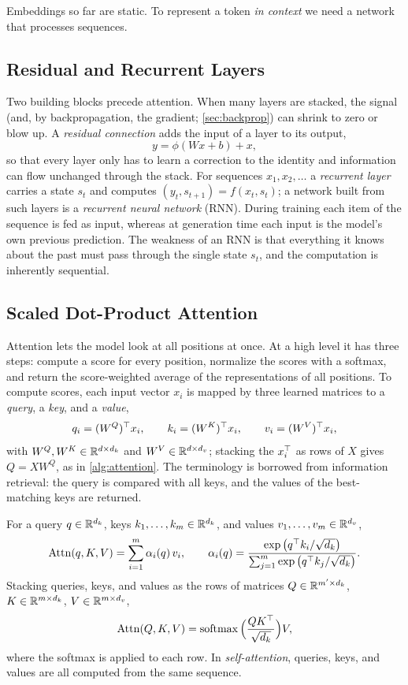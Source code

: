 Embeddings so far are static. To represent a token \emph{in context} we need a network that processes sequences.

\subsection{Residual and Recurrent Layers}

Two building blocks precede attention. When many layers are stacked, the signal (and, by backpropagation, the gradient; \cref{sec:backprop}) can shrink to zero or blow up. A \emph{residual connection} adds the input of a layer to its output,
\[
y=\phi(Wx+b)+x,
\]
so that every layer only has to learn a correction to the identity and information can flow unchanged through the stack. For sequences $x_1,x_2,\dots$ a \emph{recurrent layer} carries a state $s_t$ and computes $(y_t,s_{t+1})=f(x_t,s_t)$; a network built from such layers is a \emph{recurrent neural network} (RNN). During training each item of the sequence is fed as input, whereas at generation time each input is the model's own previous prediction. The weakness of an RNN is that everything it knows about the past must pass through the single state $s_t$, and the computation is inherently sequential.

\subsection{Scaled Dot-Product Attention}

Attention lets the model look at all positions at once. At a high level it has three steps: compute a score for every position, normalize the scores with a softmax, and return the score-weighted average of the representations of all positions. To compute scores, each input vector $x_i$ is mapped by three learned matrices to a \emph{query}, a \emph{key}, and a \emph{value},
\[
q_i=(W^Q)^{\top} x_i,\qquad k_i=(W^K)^{\top} x_i,\qquad v_i=(W^V)^{\top} x_i,
\]
with $W^Q,W^K\in\mathbb{R}^{d\times d_k}$ and $W^V\in\mathbb{R}^{d\times d_v}$; stacking the $x_i^{\top}$ as rows of $X$ gives $Q=XW^Q$, as in \cref{alg:attention}. The terminology is borrowed from information retrieval: the query is compared with all keys, and the values of the best-matching keys are returned.

\begin{definition}\label{def:attention}
For a query $q\in\mathbb{R}^{d_k}$, keys $k_1,\dots,k_m\in\mathbb{R}^{d_k}$, and values $v_1,\dots,v_m\in\mathbb{R}^{d_v}$,
\[
\mathrm{Attn}(q,K,V)=\sum_{i=1}^m\alpha_i(q)\,v_i,\qquad \alpha_i(q)=\frac{\exp\big(q^{\top} k_i/\sqrt{d_k}\big)}{\sum_{j=1}^m\exp\big(q^{\top} k_j/\sqrt{d_k}\big)}.
\]
Stacking queries, keys, and values as the rows of matrices $Q\in\mathbb{R}^{m'\times d_k}$, $K\in\mathbb{R}^{m\times d_k}$, $V\in\mathbb{R}^{m\times d_v}$,
\[
\mathrm{Attn}(Q,K,V)=\operatorname{softmax}\Big(\frac{QK^{\top}}{\sqrt{d_k}}\Big)V,
\]
where the softmax is applied to each row. In \emph{self-attention}, queries, keys, and values are all computed from the same sequence.
\end{definition}

